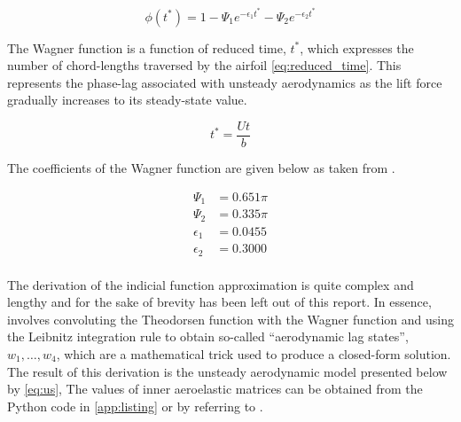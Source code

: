 \begin{equation}
    \label{eq:wagner}
    \phi\left(t^*\right) = 1
    - \Psi_1 e^{-\epsilon_1 t^*}
    - \Psi_2 e^{-\epsilon_2 t^*}
\end{equation}

The Wagner function is a function of reduced time, $t^*$, which expresses the
number of chord-lengths traversed by the airfoil \cref{eq:reduced_time}. This
represents the phase-lag associated with unsteady aerodynamics as the lift
force gradually increases to its steady-state value.

\begin{equation}
    \label{eq:reduced_time}
    t^* = \frac{Ut}{b}
\end{equation}

The coefficients of the
Wagner function are given below as taken from
\autocite[s.29]{andrianneLectureDynamicAeroelasticity}.

\begin{align*}
      \Psi_1 &= 0.651 \pi \\
      \Psi_2 &= 0.335 \pi \\
      \epsilon_1 &= 0.0455 \\
      \epsilon_2 &= 0.3000 \\
\end{align*}

The derivation of the indicial function approximation is quite complex and
lengthy and for the sake of brevity has been left out of this report. In
essence, involves convoluting the Theodorsen function with the Wagner function
and using the Leibnitz integration rule to obtain so-called ``aerodynamic lag
states'', $w_1, \dots, w_4$, which are a mathematical trick used to produce a
closed-form solution. The result of this derivation is the unsteady aerodynamic
model presented below by \cref{eq:us}, The values of inner aeroelastic
matrices can be obtained from the Python code in \cref{app:listing} or by
referring to \autocite[s.29]{andrianneLectureDynamicAeroelasticity}.

